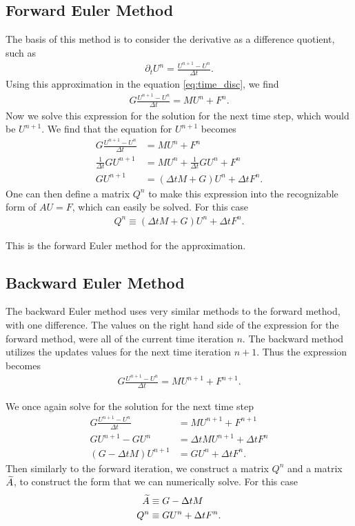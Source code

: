 \documentclass[../fem.tex]{subfile}
\begin{document}
\subsection{Forward Euler Method}%
\label{sub:forward_euler_method}

The basis of this method is to consider the derivative as a difference
quotient, such as
\begin{align*}
  \partial_t U^n=\frac{U^{n+1}-U^n}{\Delta t}.
\end{align*}
Using this approximation in the equation \ref{eq:time_disc}, we find
\begin{align*}
  G\frac{U^{n+1}-U^n}{\Delta t}=MU^n+F^n.
\end{align*}
Now we solve this expression for the solution for the next time step, which
would be $U^{n+1}$. We find that the equation for $U^{n+1}$ becomes
\begin{align*}
  G\frac{U^{n+1}-U^n}{\Delta t}&=MU^n+F^n\\
  \frac{1}{\Delta t}GU^{n+1}&=MU^n+\frac{1}{\Delta t}GU^n+F^n\\
  GU^{n+1}&=\left(\Delta tM+G\right)U^n+\Delta tF^n.
\end{align*}
One can then define a matrix $Q^n$ to make this expression into the
recognizable form of $AU=F$, which can easily be solved. For this case
\begin{align*}
  Q^n\equiv\left(\Delta tM+G\right)U^n+\Delta tF^n.
\end{align*}

This is the forward Euler method for the approximation.

\subsection{Backward Euler Method}%
\label{sub:backward_euler_method}

The backward Euler method uses very similar methods to the forward method, with
one difference. The values on the right hand side of the expression for the
forward method, were all of the current time iteration $n$. The backward method
utilizes the updates values for the next time iteration $n+1$. Thus the
expression becomes
\begin{align*}
  G\frac{U^{n+1}-U^n}{\Delta t}=MU^{n+1}+F^{n+1}.
\end{align*}

We once again solve for the solution for the next time step
\begin{align*}
  G\frac{U^{n+1}-U^n}{\Delta t}&=MU^{n+1}+F^{n+1}\\
  GU^{n+1}-GU^n&=\Delta tMU^{n+1}+\Delta tF^n\\
  \left(G-\Delta tM\right)U^{n+1}&=GU^n+\Delta tF^n.
\end{align*}
Then similarly to the forward iteration, we construct a matrix $Q^n$ and a
matrix $\widetilde{A}$, to construct the form that we can numerically solve. For this
case
\begin{align*}
  \widetilde{A}&\equiv G-\Delta tM\\
  Q^n&\equiv GU^n+\Delta tF^n.
\end{align*}
\end{document}
